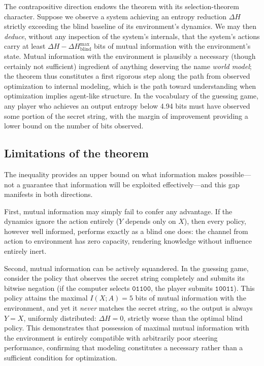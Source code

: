 \documentclass[11pt]{article}
\begin{document}
The contrapositive direction endows the theorem with its selection-theorem character. Suppose we observe a system achieving an entropy reduction $\Delta H$ strictly exceeding the blind baseline of its environment's dynamics. We may then \emph{deduce}, without any inspection of the system's internals, that the system's actions carry at least $\Delta H - \Delta H^{\max}_{\text{blind}}$ bits of mutual information with the environment's state. Mutual information with the environment is plausibly a necessary (though certainly not sufficient) ingredient of anything deserving the name \emph{world model}; the theorem thus constitutes a first rigorous step along the path from observed optimization to internal modeling, which is the path toward understanding when optimization implies agent-like structure. In the vocabulary of the guessing game, any player who achieves an output entropy below 4.94 bits must have observed some portion of the secret string, with the margin of improvement providing a lower bound on the number of bits observed.

\subsection{Limitations of the theorem}
\label{sec:tlcaveats}

The inequality provides an upper bound on what information makes possible---not a guarantee that information will be exploited effectively---and this gap manifests in both directions.

First, mutual information may simply fail to confer any advantage. If the dynamics ignore the action entirely ($Y$ depends only on $X$), then every policy, however well informed, performs exactly as a blind one does: the channel from action to environment has zero capacity, rendering knowledge without influence entirely inert.

Second, mutual information can be actively squandered. In the guessing game, consider the policy that observes the secret string completely and submits its bitwise negation (if the computer selects $\texttt{01100}$, the player submits $\texttt{10011}$). This policy attains the maximal $I(X;A) = 5$ bits of mutual information with the environment, and yet it \emph{never} matches the secret string, so the output is always $Y = X$, uniformly distributed: $\Delta H = 0$, strictly worse than the optimal blind policy. This demonstrates that possession of maximal mutual information with the environment is entirely compatible with arbitrarily poor steering performance, confirming that modeling constitutes a necessary rather than a sufficient condition for optimization.
\end{document}
